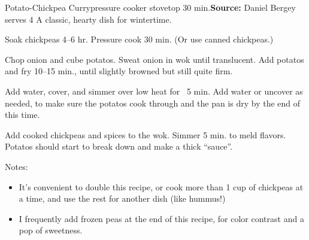 \begin{recipe}{Potato-Chickpea Curry}{pressure cooker \hfill stovetop \hfill 30 min.}{\textbf{Source:} Daniel Bergey \hfill serves 4}
  \freeform A classic, hearty dish for wintertime.

Soak chickpeas 4--6 hr. Pressure cook 30 min. (Or use canned chickpeas.)

Chop onion and cube potatos. Sweat onion in wok until translucent. Add potatos and fry 10--15 min., until slightly browned but still quite firm.

Add water, cover, and simmer over low heat for ~5 min. Add water or uncover as needed, to make sure the potatos cook through and the pan is dry by the end of this time.

Add cooked chickpeas and spices to the wok. Simmer 5 min. to meld flavors. Potatos should start to break down and make a thick ``sauce''.

\freeform Notes:
\begin{itemize}
  \item It's convenient to double this recipe, or cook more than 1 cup of chickpeas at a time, and use the rest for another dish (like hummus!)
  \item I frequently add frozen peas at the end of this recipe, for color contrast and a pop of sweetness.
\end{itemize}
\end{recipe}